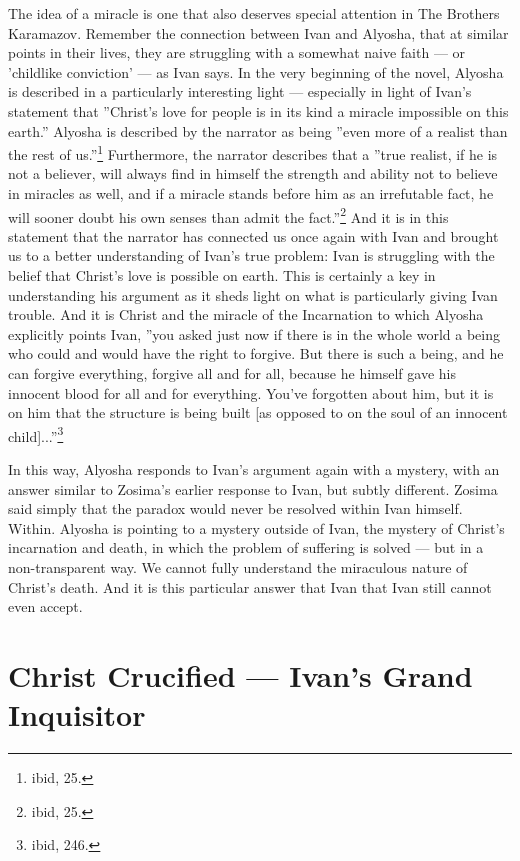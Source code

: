The idea of a miracle is one that also deserves special attention in The Brothers Karamazov. Remember the connection between Ivan and Alyosha, that at similar points in their lives, they are struggling with a somewhat naive faith --- or 'childlike conviction' --- as Ivan says. In the very beginning of the novel, Alyosha is described in a particularly interesting light --- especially in light of Ivan's statement that ''Christ's love for people is in its kind a miracle impossible on this earth.'' Alyosha is described by the narrator as being ''even more of a realist than the rest of us.''\footnote{ibid, 25.} Furthermore, the narrator describes that a ''true realist, if he is not a believer, will always find in himself the strength and ability not to believe in miracles as well, and if a miracle stands before him as an irrefutable fact, he will sooner doubt his own senses than admit the fact.''\footnote{ibid, 25.} And it is in this statement that the narrator has connected us once again with Ivan and brought us to a better understanding of Ivan's true problem: Ivan is struggling with the belief that Christ's love is possible on earth. This is certainly a key in understanding his argument as it sheds light on what is particularly giving Ivan trouble. And it is Christ and the miracle of the Incarnation to which Alyosha explicitly points Ivan, ''you asked just now if there is in the whole world a being who could and would have the right to forgive. But there is such a being, and he can forgive everything, forgive all and for all, because he himself gave his innocent blood for all and for everything. You've forgotten about him, but it is on him that the structure is being built [as opposed to on the soul of an innocent child]...''\footnote{ibid, 246.}
 
In this way, Alyosha responds to Ivan's argument again with a mystery, with an answer similar to Zosima's earlier response to Ivan, but subtly different. Zosima said simply that the paradox would never be resolved within Ivan himself. Within. Alyosha is pointing to a mystery outside of Ivan, the mystery of Christ's incarnation and death, in which the problem of suffering is solved --- but in a non-transparent way. We cannot fully understand the miraculous nature of Christ's death. And it is this particular answer that Ivan that Ivan still cannot even accept.

\section{Christ Crucified --- Ivan's Grand Inquisitor}

